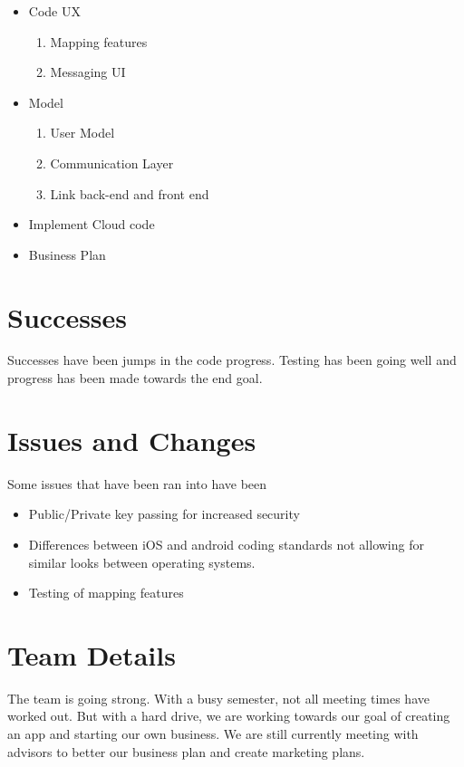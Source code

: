 \documentclass[11pt]{article}
\begin{document}
	\begin{itemize}
	\item Code UX
		\begin{enumerate}
		\item Mapping features
		\item Messaging UI
		\end{enumerate}
	\item Model
		\begin{enumerate}
		\item User Model
		\item Communication Layer
		\item Link back-end and front end
		\end{enumerate}
	\item Implement Cloud code
	\item Business Plan

	\end{itemize}

\section*{Successes}
Successes have been jumps in the code progress. Testing has been going well and progress has been made towards the end goal. 


\section*{Issues and Changes}
Some issues that have been ran into have been

	\begin{itemize}
	\item Public/Private key passing for increased security
	\item Differences between iOS and android coding standards not allowing for similar looks between operating systems.
	\item Testing of mapping features 
	\end{itemize}




	
\section*{Team Details}
The team is going strong. With a busy semester, not all meeting times have worked out. But with a hard drive, we are working towards our goal of creating an app and starting our own business. We are still currently meeting with advisors to better our business plan and create marketing plans.
\end{document}
